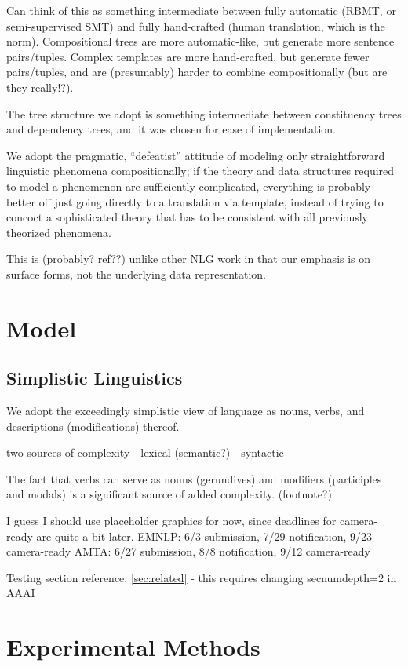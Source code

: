 Can think of this as something intermediate between fully automatic (RBMT, or semi-supervised SMT) and fully hand-crafted (human translation, which is the norm).
Compositional trees are more automatic-like, but generate more sentence pairs/tuples.
Complex templates are more hand-crafted, but generate fewer pairs/tuples, and are (presumably) harder to combine compositionally (but are they really!?).

The tree structure we adopt is something intermediate between constituency trees and dependency trees, and it was chosen for ease of implementation.

We adopt the pragmatic, ``defeatist'' attitude of modeling only straightforward linguistic phenomena compositionally; if the theory and data structures required to model a phenomenon are sufficiently complicated, everything is probably better off just going directly to a translation via template, instead of trying to concoct a sophisticated theory that has to be consistent with all previously theorized phenomena.

This is (probably? ref??) unlike other NLG work in that our emphasis is on surface forms, not the underlying data representation.


\section{Model}

\subsection{Simplistic Linguistics}
We adopt the exceedingly simplistic view of language as nouns, verbs, and descriptions (modifications) thereof.

two sources of complexity
- lexical (semantic?)
- syntactic 

The fact that verbs can serve as nouns (gerundives) and modifiers (participles and modals) is a significant source of added complexity. (footnote?)


I guess I should use placeholder graphics for now, since deadlines for camera-ready are quite a bit later.
EMNLP: 6/3 submission, 7/29 notification, 9/23 camera-ready
AMTA: 6/27 submission, 8/8 notification, 9/12 camera-ready

Testing section reference: \ref{sec:related} - this requires changing secnumdepth=2 in AAAI

\section{Experimental Methods}

